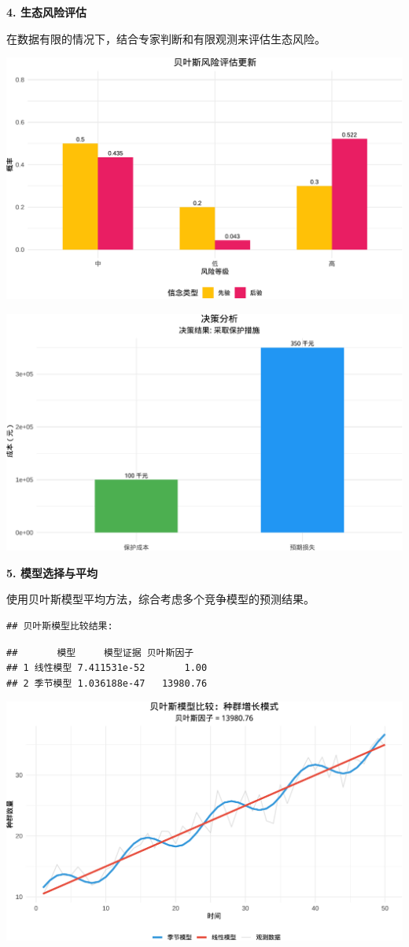 \documentclass[
]{book}
\begin{document}
\textbf{4. 生态风险评估}

在数据有限的情况下，结合专家判断和有限观测来评估生态风险。

\begin{center}\includegraphics[width=0.8\linewidth]{ecological-statistics_files/figure-latex/unnamed-chunk-11-1} \end{center}

\begin{center}\includegraphics[width=0.8\linewidth]{ecological-statistics_files/figure-latex/unnamed-chunk-11-2} \end{center}

\textbf{5. 模型选择与平均}

使用贝叶斯模型平均方法，综合考虑多个竞争模型的预测结果。

\begin{verbatim}
## 贝叶斯模型比较结果:
\end{verbatim}

\begin{verbatim}
##       模型     模型证据 贝叶斯因子
## 1 线性模型 7.411531e-52       1.00
## 2 季节模型 1.036188e-47   13980.76
\end{verbatim}

\begin{center}\includegraphics[width=0.8\linewidth]{ecological-statistics_files/figure-latex/unnamed-chunk-12-1} \end{center}
\end{document}
